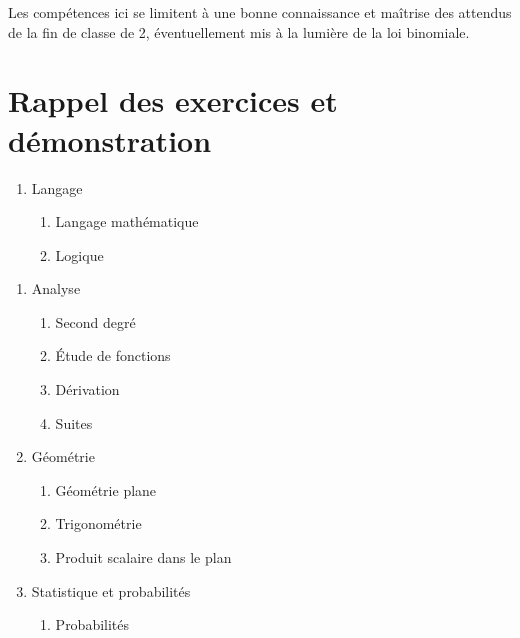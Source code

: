 \documentclass[a4paper,12pt,french]{article}
\begin{document}
Les compétences ici se limitent à une bonne connaissance et maîtrise des
attendus de la fin de classe de 2, éventuellement mis à la
lumière de la loi binomiale.

\section{Rappel des exercices et démonstration}

\begin{enumerate}
  \item Langage
    \begin{enumerate}
      \item Langage mathématique
      \item Logique
    \end{enumerate}
\end{enumerate}
\begin{enumerate}[start=3]
  \item Analyse
    \begin{enumerate}
      \item Second degré
      \item Étude de fonctions
      \item Dérivation
      \item Suites
    \end{enumerate}
  \item Géométrie
    \begin{enumerate}
      \item Géométrie plane
      \item Trigonométrie
      \item Produit scalaire dans le plan
    \end{enumerate}
    \item Statistique et probabilités
      \begin{enumerate}[start=2]
        \item Probabilités
      \end{enumerate}
\end{enumerate}
\end{document}
